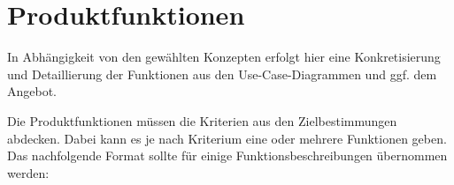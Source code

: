 

\chapter{Produktfunktionen}
\label{chap:product_functions}

\iffalse
In Abhängigkeit von den gewählten Konzepten erfolgt hier eine Konkretisierung
und Detaillierung der Funktionen aus den Use-Case-Diagrammen und ggf. dem
Angebot.

Die Produktfunktionen müssen die Kriterien aus den Zielbestimmungen abdecken.
Dabei kann es je nach Kriterium eine oder mehrere Funktionen geben.
Das nachfolgende Format sollte für einige Funktionsbeschreibungen übernommen werden:

